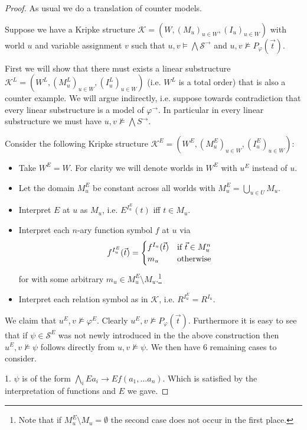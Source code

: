 \documentclass[a4paper,12pt]{report}
\theoremstyle{definition}
\theoremstyle{definition}
\theoremstyle{definition}
\theoremstyle{definition}
\theoremstyle{definition}
\theoremstyle{definition}
\theoremstyle{definition}
\begin{document}
	\begin{proof}
		As usual we do a translation of counter models.
		
		Suppose we have a Kripke structure $\mathcal K = (W, (M_u)_{u\in W}, (I_u)_{u\in W})$ with world $u$ and variable assignment $v$ such that $u, v\models \bigwedge \mathcal S^\to$ and $u, v\not\models P_\varphi(\vec t)$.
		
		First we will show that there must exists a linear substructure $\mathcal K^L = (W^L, (M^L_u)_{u\in W}, (I^L_u)_{u\in W})$ (i.e. $W^L$ is a total order) that is also a counter example. We will argue indirectly, i.e. suppose towards contradiction that every linear substructure is a model of $\varphi^\to$. In particular in every linear substructure we must have $u, v\not\models\mathcal\bigwedge S^\to$.
		
		 Consider the following Kripke structure $\mathcal K^E = (W^E, (M^E_u)_{u\in W}, (I^E_u)_{u\in W})$:
		\begin{itemize}
			\item Take $W^E = W$. For clarity we will denote worlds in $W^E$ with $u^E$ instead of $u$.
			\item Let the domain $M^E_u$ be constant across all worlds with $M^E_u = \underset{u\in U}{\bigcup} M_u$.
			\item \vspace{-3mm}Interpret $E$ at $u$ as $M_u$, i.e. $E^{I_u^E}(t)$ iff $t\in M_u$.
			\item Interpret each $n$-ary function symbol $f$ at $u$ via $$f^{I_u^E}(\vec t) = \begin{cases}f^{I_u}(\vec t) &\text{if $\vec t\in M_u^n$}\\m_u&\text{otherwise}\end{cases}\\$$ for with some arbitrary $m_u\in M^E_u\setminus M_u$.\footnote{Note that if $M^E_u\setminus M_u = \emptyset$ the second case does not occur in the first place.}
			\item Interpret each relation symbol as in $\mathcal K$, i.e. $R^{I_u^E} = R^{I_u}$.
		\end{itemize}
		We claim that $u^E, v\not\models \varphi^E$. Clearly $u^E, v\not\models P_\varphi(\vec t)$. Furthermore it is easy to see that if $\psi\in\mathcal S^E$ was not newly introduced in the the above construction then $u^E, v\not\models \psi$ follows directly from $u, v\not\models\psi$. We then have $6$ remaining cases to consider.
		
		1. $\psi$ is of the form $\bigwedge_i E a_i \to Ef(a_1,\dots a_n)$. Which is satisfied by the interpretation of functions and $E$ we gave.
		

\end{proof}
\end{document}
